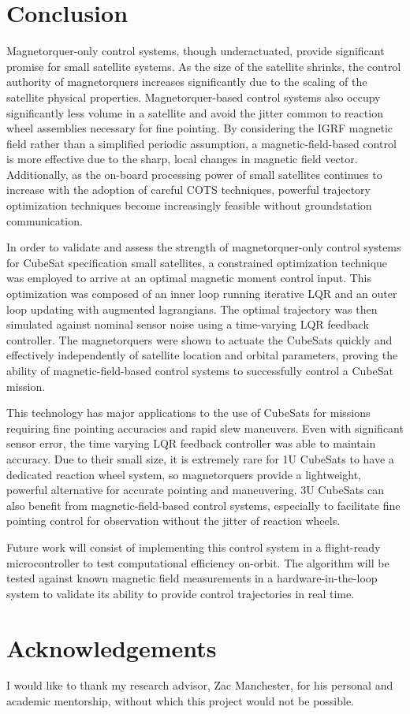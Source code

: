 \documentclass[letterpaper, preprint, paper,11pt]{IAA-AAS}	%
\begin{document}
\section{Conclusion}
Magnetorquer-only control systems, though underactuated, provide significant promise for small satellite systems. As the size of the satellite shrinks, the control authority of magnetorquers increases significantly due to the scaling of the satellite physical properties. Magnetorquer-based control systems also occupy significantly less volume in a satellite and avoid the jitter common to reaction wheel assemblies necessary for fine pointing. By considering the IGRF magnetic field rather than a simplified periodic assumption, a magnetic-field-based control is more effective due to the sharp, local changes in magnetic field vector. Additionally, as the on-board processing power of small satellites continues to increase with the adoption of careful COTS techniques, powerful trajectory optimization techniques become increasingly feasible without groundstation communication. 

In order to validate and assess the strength of magnetorquer-only control systems for CubeSat specification small satellites, a constrained optimization technique was employed to arrive at an optimal magnetic moment control input. This optimization was composed of an inner loop running iterative LQR and an outer loop updating with augmented lagrangians. The optimal trajectory was then simulated against nominal sensor noise using a time-varying LQR feedback controller. The magnetorquers were shown to actuate the CubeSats quickly and effectively independently of satellite location and orbital parameters, proving the ability of magnetic-field-based control systems to successfully control a CubeSat mission. 

This technology has major applications to the use of CubeSats for missions requiring fine pointing accuracies and rapid slew maneuvers. Even with significant sensor error, the time varying LQR feedback controller was able to maintain accuracy. Due to their small size, it is extremely rare for 1U CubeSats to have a dedicated reaction wheel system, so magnetorquers provide a lightweight, powerful alternative for accurate pointing and maneuvering. 3U CubeSats can also benefit from magnetic-field-based control systems, especially to facilitate fine pointing control for observation without the jitter of reaction wheels. 

Future work will consist of implementing this control system in a flight-ready microcontroller to test computational efficiency on-orbit. The algorithm will be tested against known magnetic field measurements in a hardware-in-the-loop system to validate its ability to provide control trajectories in real time.  

\section{Acknowledgements}
I would like to thank my research advisor, Zac Manchester, for his personal and academic mentorship, without which this project would not be possible.  

\end{document}
